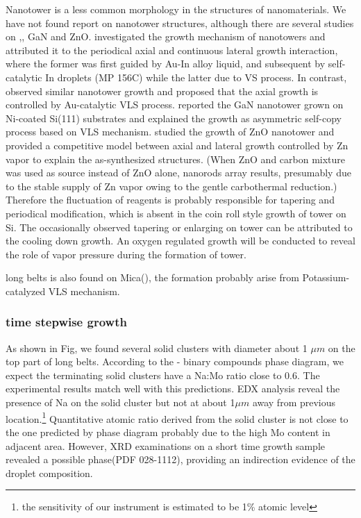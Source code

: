 Nanotower is a less common morphology in the structures of nanomaterials.\cite{Kharissova2010} We have not found report on   nanotower structures, although there are several studies on ,\cite{Jean2010,Yan2007}, GaN\cite{Xiao2012} and ZnO\cite{Zhang2013c}. \citeauthor{Jean2010} investigated the growth mechanism of  nanotowers and attributed it to the periodical axial and continuous lateral growth interaction, where the former was first guided by Au-In alloy liquid, and subsequent by self-catalytic In droplets (MP 156C) while the latter due to VS process. In contrast, \citeauthor{Yan2007} observed similar  nanotower growth and proposed that the axial growth is controlled by Au-catalytic VLS process. \citeauthor{Xiao2012} reported the GaN nanotower grown on Ni-coated Si(111) substrates and explained the growth as asymmetric self-copy process based on VLS mechanism. \citeauthor{Zhang2013c} studied the growth of ZnO nanotower and provided a competitive model between axial and lateral growth controlled by Zn vapor to explain the as-synthesized structures. (When ZnO and carbon mixture was used as source instead of ZnO alone, nanorods array results, presumably due to the stable supply of Zn vapor owing to the gentle carbothermal reduction.) Therefore the fluctuation of reagents is probably responsible for tapering and periodical modification, which is absent in the coin roll style growth of  tower on Si. The occasionally observed tapering or enlarging on  tower can be attributed to the cooling down growth.  An oxygen regulated growth will be conducted to reveal the role of vapor pressure during the formation of tower.

long belts  is also found on Mica(), the formation probably arise from Potassium-catalyzed VLS mechanism.\cite{Hu2011}

\subsubsection{time stepwise growth}




As shown in Fig, we found several solid clusters with diameter about 1 $\mu m$ on the top part of long belts. According to the - binary compounds phase diagram, we expect the terminating solid clusters have a Na:Mo ratio close to 0.6. The experimental results match well with this predictions. EDX analysis reveal the presence of Na on the solid cluster but not at about 1$\mu m$ away from previous location.\footnote{the sensitivity of our instrument is estimated to be 1\% atomic level} Quantitative atomic ratio derived from the solid cluster is not close to the one predicted by phase diagram probably due to the high Mo content in adjacent area. However, XRD examinations on a short time growth sample revealed a possible  phase(PDF 028-1112), providing an indirection evidence of the droplet composition.

